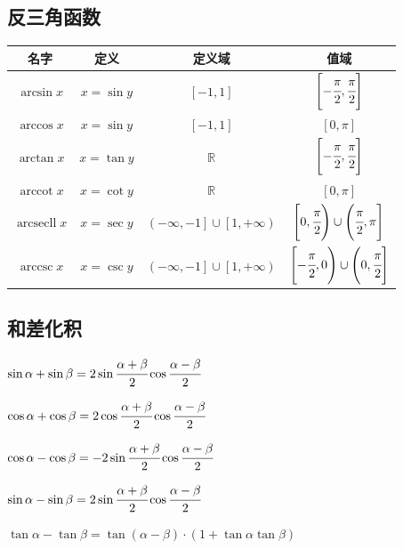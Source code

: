 \documentclass[UTF8,12pt]{ctexbook}
\newcommand{\mediumBigCase}[1]{\left[#1\right]}
\DeclareMathOperator{\arccot}{arccot}
\DeclareMathOperator{\arcsec}{arcsecll}
\DeclareMathOperator{\arccsc}{arccsc}
\DeclareMathOperator{\mathRealNumberCollection}{\mathbb{R}}
\begin{document}
{{\subsection{反三角函数}{
  \begin{tabular}{|c|c|c|c|}
    \hline
    名字        & 定义         & 定义域                                                & 值域                                                                 \\
    \hline
    $\arcsin x$ & $x = \sin y$ & $\mediumBigCase{-1,1}$                                & $\mediumBigCase{-\cfrac{\pi}{2},\cfrac{\pi}{2}}$                     \\
    \hline
    $\arccos x$ & $x = \sin y$ & $\mediumBigCase{-1,1}$                                & $\mediumBigCase{0,\pi}$                                              \\
    \hline
    $\arctan x$ & $x = \tan y$ & $\mathRealNumberCollection$                           & $\mediumBigCase{-\cfrac{\pi}{2},\cfrac{\pi}{2}}$                     \\
    \hline
    $\arccot x$ & $x = \cot y$ & $\mathRealNumberCollection$                           & $\mediumBigCase{0,\pi}$                                              \\
    \hline
    $\arcsec x$ & $x = \sec y$ & $\left(-\infty,-1\right] \cup \left[1,+\infty\right)$ & $\left[0,\cfrac{\pi}{2}\right) \cup \left(\cfrac{\pi}{2},\pi\right]$ \\
    \hline
    $\arccsc x$ & $x = \csc y$ & $\left(-\infty,-1\right] \cup \left[1,+\infty\right)$ & $\left[-\cfrac{\pi}{2},0\right) \cup \left(0,\cfrac{\pi}{2}\right]$  \\
    \hline
  \end{tabular}
}%

\subsection{和差化积}{
  $\sin{\alpha}+\sin{\beta} = 2\sin{\cfrac{\alpha + \beta}{2}}\cos{\cfrac{\alpha - \beta}{2}}$

  $\cos{\alpha}+\cos{\beta} = 2\cos{\cfrac{\alpha + \beta}{2}\cos{\cfrac{\alpha-\beta}{2}}}$

  $\cos{\alpha}-\cos{\beta} = -2\sin{\cfrac{\alpha + \beta}{2}}\cos{\cfrac{\alpha - \beta}{2}}$

  $\sin{\alpha}-\sin{\beta} = 2\sin{\cfrac{\alpha + \beta}{2}}\cos{\cfrac{\alpha - \beta}{2}}$

  $\tan\alpha - \tan\beta = \tan(\alpha - \beta) \cdot (1 + \tan\alpha\tan\beta)$
}%

}}
\end{document}
